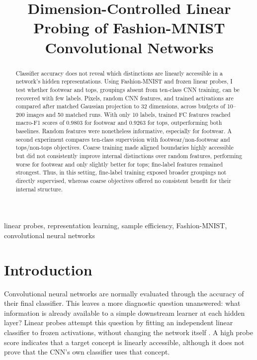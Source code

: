 \documentclass[conference]{IEEEtran}
\title{Dimension-Controlled Linear Probing of Fashion-MNIST Convolutional Networks}
\author{\IEEEauthorblockN{Hendrik Strauss}
\IEEEauthorblockA{Introduction to Deep Learning\\
Universit\"at Osnabr\"uck\\
\relax[hestrauss@uni-osnabrueck.de]}}
\begin{document}
\maketitle

\begin{abstract}
Classifier accuracy does not reveal which distinctions are linearly accessible
in a network's hidden representations. Using Fashion-MNIST and frozen linear
probes, I test whether footwear and tops, groupings absent from ten-class CNN
training, can be recovered with few labels. Pixels, random CNN features, and
trained activations are compared after matched Gaussian projection to 32
dimensions, across budgets of 10--200 images and 50 matched runs. With only 10
labels, trained FC features reached macro-F1 scores of $0.9803$ for footwear
and $0.9263$ for tops, outperforming both baselines. Random features were
nonetheless informative, especially for footwear. A second experiment compares
ten-class supervision with footwear/non-footwear and tops/non-tops objectives.
Coarse training made aligned boundaries highly accessible but did not
consistently improve internal distinctions over random features, performing
worse for footwear and only slightly better for tops; fine-label features
remained strongest. Thus, in this setting, fine-label training exposed broader
groupings not directly supervised, whereas coarse objectives offered no
consistent benefit for their internal structure.
\end{abstract}

\begin{IEEEkeywords}
linear probes, representation learning, sample efficiency, Fashion-MNIST,
convolutional neural networks
\end{IEEEkeywords}

\section{Introduction}
Convolutional neural networks are normally evaluated through the accuracy of
their final classifier. This leaves a more diagnostic question unanswered:
what information is already available to a simple downstream learner at each
hidden layer? Linear probes attempt this question by fitting an independent
linear classifier to frozen activations, without changing the network itself
\cite{alain2016}. A high probe score indicates that a target concept is
linearly accessible, although it does not prove that the CNN's own classifier
uses that concept.
\end{document}
